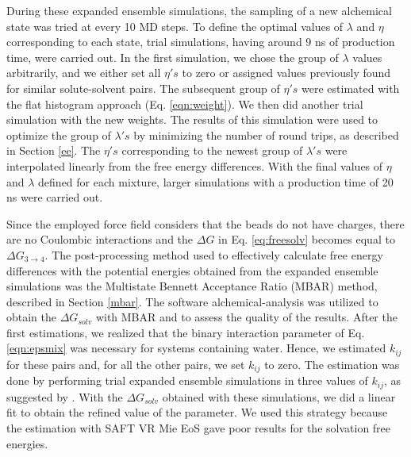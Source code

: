 During these expanded ensemble simulations, the sampling of a new alchemical state was tried at every 10 MD steps. To define the optimal values of $\lambda$ and $\eta$ corresponding to each state, trial simulations, having around 9 ns of production time, were carried out. In the first simulation, we chose the group of $\lambda$ values arbitrarily, and we either set all $\eta 's$ to zero or assigned values previously found for similar solute-solvent pairs. The subsequent group of $\eta 's$ were estimated with the flat histogram approach (Eq. \eqref{eqn:weight}). We then did another trial simulation with the new weights. The results of this simulation were used to optimize the group of $\lambda 's$ by minimizing the number of round trips, as described in Section \ref{ee}. The $\eta 's$ corresponding to the newest group of $\lambda 's$ were interpolated linearly from the free energy differences. With the final values of $\eta$ and $\lambda $ defined for each mixture, larger simulations with a production time of 20 ns were carried out. 

Since the employed force field considers that the beads do not have charges, there are no Coulombic interactions and the $\Delta G$ in Eq. \eqref{eq:freesolv} becomes equal to $\Delta G_{3 \rightarrow 4} $. The post-processing method used to effectively calculate free energy differences with the potential energies obtained from the expanded ensemble simulations was the Multistate Bennett Acceptance Ratio (MBAR) method, described in Section \ref{mbar}. The software alchemical-analysis \cite{klimovich} was utilized to obtain the $\Delta G_{solv}$ with MBAR and to assess the quality of the results. After the first estimations, we realized that the binary interaction parameter of Eq. \eqref{eqn:epsmix} was necessary for systems containing water. Hence, we estimated  $k_{ij}$ for these pairs and, for all the other pairs, we set  $k_{ij}$ to zero. The estimation was done by performing trial expanded ensemble simulations in three values of $k_{ij}$, as suggested by . With the $\Delta G_{solv}$ obtained with these simulations, we did a linear fit to obtain the refined value of the parameter. We used this strategy because the estimation with SAFT VR Mie EoS gave poor results for the solvation free energies.

